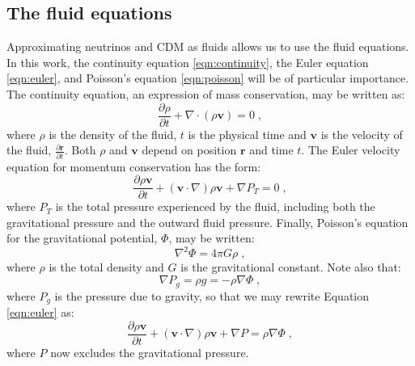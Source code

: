 \documentclass{aastex}
\begin{document}
\subsection{The fluid equations}
\label{sec:Fluids}

Approximating neutrinos and CDM as fluids allows us to
use the fluid equations.  In this work, the
continuity equation \eqref{eqn:continuity}, the Euler
equation \eqref{eqn:euler}, and Poisson's equation \eqref{eqn:poisson} 
will be of particular importance.
The continuity equation, an expression of mass conservation, may be written as:
\begin{equation} \label{eqn:continuity}
  \frac{\partial \rho }{\partial t} +\nabla \cdot ( \rho \mathbf{v} ) = 0 \;,
\end{equation}
where $\rho$ is the density of the fluid, $t$ is the physical time
and $\mathbf{v}$ is the velocity of the fluid, $\frac{\partial
  \mathbf{r}}{\partial t}$.  Both $\rho$ and $\mathbf{v}$ depend on
position $\mathbf{r}$ and time $t$.  %
The
Euler velocity equation for momentum conservation has the form:
\begin{equation}\label{eqn:euler}
  \frac{ \partial \rho \mathbf{v} }{ \partial t} + 
  (\mathbf{v} \cdot \nabla ) \rho \mathbf{v}
+ \nabla P_T = 0 \;,
\end{equation}
where $P_T$ is the total pressure experienced by the fluid, including
both the gravitational pressure and the outward fluid pressure. 
Finally, Poisson's equation for the gravitational potential, $\Phi$, may be written:
\begin{equation}\label{eqn:poisson}
  \nabla^2\Phi=4\pi G \rho \;,
\end{equation}
where $\rho$ is the total density and $G$ is the gravitational constant.  Note also that:
\begin{equation}
  \nabla P_g = \rho g = - \rho \nabla \Phi \;,
\end{equation}
where $P_g$ is the pressure due to gravity, so that we may rewrite Equation \eqref{eqn:euler} as:
\begin{equation}\label{eqn:euler2}
  \frac{ \partial \rho \mathbf{v} }{ \partial t} + 
  (\mathbf{v} \cdot \nabla) \rho \mathbf{v}
+ \nabla P = \rho \nabla \Phi \;,
\end{equation}
where $P$ now excludes the gravitational pressure.

\end{document}
